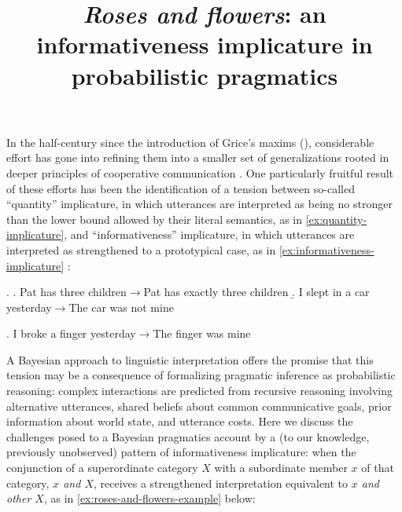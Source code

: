 \documentclass[11pt]{article}
\title{\vspace{-1.5cm}\large \bf \emph{Roses and flowers}: an informativeness implicature in
  probabilistic pragmatics\vspace{-1.7cm}}
\date{}
\begin{document}
\maketitle

\noindent
In the half-century since the introduction of Grice's maxims
(\citeyear{grice:1957,grice:1975}), considerable effort has gone
into refining them into a smaller set of generalizations rooted in
deeper principles of cooperative communication \citep[inter
alia]{horn:1984,sperber-wilson:1986,levinson:2000}. One particularly
fruitful result of these efforts has been the identification of a
tension between so-called ``quantity'' implicature, in which
utterances are interpreted as being no stronger than the lower bound
allowed by their literal semantics, as in \ref{ex:quantity-implicature}, and
``informativeness'' implicature, in which utterances are interpreted
as strengthened to a prototypical case, as in
\ref{ex:informativeness-implicature}
\citep{atlas-levinson:1981,horn:1984}:

\ex. \label{ex:quantity-implicature}
\a. Pat has three children$\rightarrow$Pat has exactly three children
\b. I slept in a car yesterday$\rightarrow$The car was not mine 

\ex. I broke a finger yesterday$\rightarrow$The finger was mine \label{ex:informativeness-implicature}

A Bayesian approach to linguistic
interpretation offers the promise that this tension may be a consequence of
 formalizing pragmatic inference as probabilistic reasoning:
 complex interactions are predicted from recursive reasoning involving alternative utterances, shared
beliefs about common communicative goals, prior information about
world state, and utterance costs.  Here we discuss the challenges
posed to a Bayesian pragmatics account by a (to our knowledge,
previously unobserved) pattern of informativeness implicature: when
the conjunction of a superordinate category $X$ with a subordinate
member $x$ of that category, \emph{$x$ and $X$}, receives a
strengthened interpretation equivalent to \emph{$x$ and other $X$}, as
in \ref{ex:roses-and-flowers-example} below:
\end{document}
